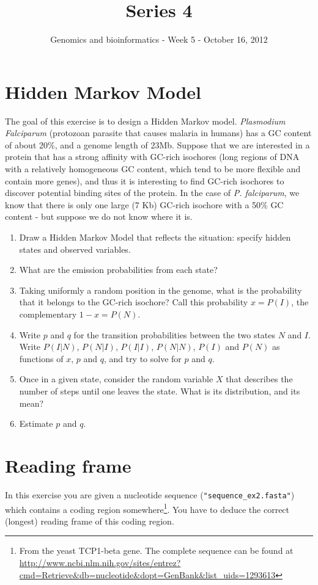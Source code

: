 \documentclass[a4paper,11pt]{article}
\title{Series 4}
\date{}
\author{Genomics and bioinformatics - Week 5 - October 16, 2012}
\begin{document}
\maketitle

\section{Hidden Markov Model}
The goal of this exercise is to design a Hidden Markov model. \emph{Plasmodium Falciparum} (protozoan parasite that causes malaria in humans) has a GC content of about 20\%, and a genome length of 23Mb. Suppose that we are interested in a protein that has a strong affinity with GC-rich isochores (long regions of DNA with a relatively homogeneous GC content, which tend to be more flexible and contain more genes), and thus it is interesting to find GC-rich isochores to discover potential binding sites of the protein. In the case of \emph{P. falciparum}, we know that there is only one large (7 Kb) GC-rich isochore with a 50\% GC content - but suppose we do not know where it is.
\begin{enumerate}
\item Draw a Hidden Markov Model that reflects the situation: specify hidden states and observed variables.
\item What are the emission probabilities from each state?
\item Taking uniformly a random position in the genome, what is the probability that it belongs to the GC-rich isochore? Call this probability $x = P(I)$, the complementary $1-x = P(N)$.
\item Write $p$ and $q$ for the transition probabilities between the two states $N$ and $I$. Write $P(I|N)$, $P(N|I)$, $P(I|I)$, $P(N|N)$, $P(I)$ and $P(N)$ as functions of $x$, $p$ and $q$, and try to solve for $p$ and $q$.
\item Once in a given state, consider the random variable $X$ that describes the number of steps until one leaves the state. What is its distribution, and its mean?
\item Estimate $p$ and $q$.
\end{enumerate}

\section{Reading frame}
In this exercise you are given a nucleotide sequence (\texttt{"sequence\_ex2.fasta"}) which contains a coding region somewhere\footnote{From the yeast TCP1-beta gene. The complete sequence can be found at \url{http://www.ncbi.nlm.nih.gov/sites/entrez?cmd=Retrieve&db=nucleotide&dopt=GenBank&list_uids=1293613}}. You have to deduce the correct (longest) reading frame of this coding region.
\end{document}
